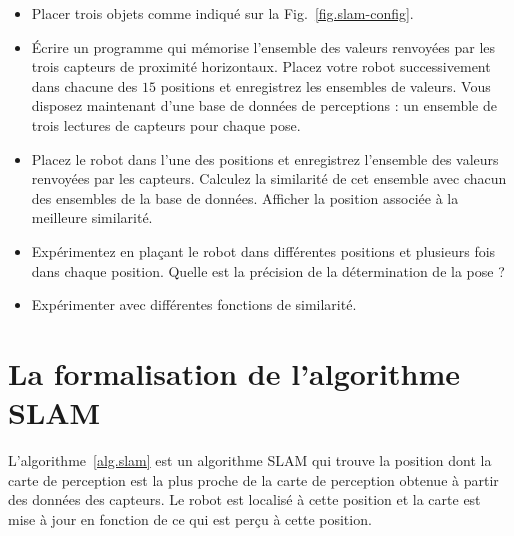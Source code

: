 \begin{framed}
\begin{itemize}
\item Placer trois objets comme indiqué sur la Fig.~\ref{fig.slam-config}.
\item Écrire un programme qui mémorise l'ensemble des valeurs renvoyées par les trois capteurs de proximité horizontaux. Placez votre robot successivement dans chacune des $15$ positions et enregistrez les ensembles de valeurs. Vous disposez maintenant d'une base de données de perceptions : un ensemble de trois lectures de capteurs pour chaque pose.
\item Placez le robot dans l'une des positions et enregistrez l'ensemble des valeurs renvoyées par les capteurs. Calculez la similarité de cet ensemble avec chacun des ensembles de la base de données. Afficher la position associée à la meilleure similarité.
\item Expérimentez en plaçant le robot dans différentes positions et plusieurs fois dans chaque position. Quelle est la précision de la détermination de la pose ?
\item Expérimenter avec différentes fonctions de similarité.
\end{itemize}
\end{framed}

\section{La formalisation de l'algorithme SLAM}\label{s.slam-formal}

L'algorithme~\ref{alg.slam} est un algorithme SLAM qui trouve la position dont la carte de perception est la plus proche de la carte de perception obtenue à partir des données des capteurs. Le robot est localisé à cette position et la carte est mise à jour en fonction de ce qui est perçu à cette position.


